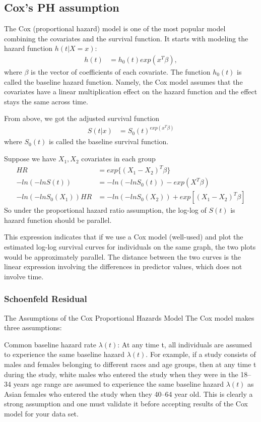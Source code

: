 \documentclass[11pt]{article} %
\begin{document}
 


\subsection{Cox's PH assumption}
The Cox (proportional hazard) model is one of the most popular model combining the covariates and the survival function. It starts with modeling the hazard function $h(t|X = x)$:
\begin{align*}
	h(t) &= h_0(t) exp(x^T \beta), 
\end{align*}
where $\beta$ is the vector of coefficients of each covariate. The function $h_0(t)$ is called the baseline hazard function. Namely, the Cox model assumes that the covariates have a linear multiplication effect on the hazard function and the effect stays the same across time. 

From above, we got the adjusted survival function 
\begin{align*}
	S(t|x) &=  S_0(t)^{exp(x^T \beta)}
\end{align*}
where $S_0(t)$ is called the baseline survival function.

Suppose we have $X_1, X_2$ covariates in each group
\begin{align*}
	HR & = exp \{( X_1 - X_2)^T \beta \}\\
	- ln(-ln S(t)) & = - ln(-ln S_0(t)) -exp(X^T\beta)\\
	- ln(-ln S_0(X_1)) HR &= - ln(-ln S_0(X_2))+ exp[(X_1 - X_2)^T\beta]
\end{align*}
So under the proportional hazard ratio assumption, the log-log of $S(t)$ is hazard function should be parallel. 

This expression indicates that if we use a Cox model (well-used) and plot the estimated log-log survival curves for individuals on the same graph, the two plots would be approximately parallel. The distance between the two curves is the linear expression involving the differences in predictor values, which does not involve time.

\subsubsection{Schoenfeld Residual}

The Assumptions of the Cox Proportional Hazards Model
The Cox model makes three assumptions:

Common baseline hazard rate $\lambda(t)$: At any time t, all individuals are assumed to experience the same baseline hazard $\lambda(t)$. For example, if a study consists of males and females belonging to different races and age groups, then at any time t during the study, white males who entered the study when they were in the 18–34 years age range are assumed to experience the same baseline hazard $\lambda(t)$ as Asian females who entered the study when they 40–64 year old. This is clearly a strong assumption and one must validate it before accepting results of the Cox model for your data set.
\end{document}
